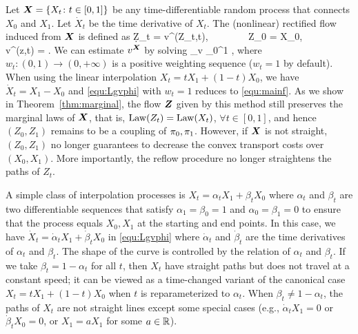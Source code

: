 Let 
${{\boldsymbol{X}}} = \{X_t\colon t\in[0,1]\}$  be  any  time-differentiable 
random process that connects $X_0$ and $X_1$. Let $\dot X_t$ be the time derivative of $X_t$. 
The (nonlinear) rectified flow induced from ${\boldsymbol{X}}$ is defined as 
\bb 
\d Z_t = v^\X(Z_t,t)\dt, ~~~~~~~ Z_0 = X_0, ~~~~   ~~~~ v^\X(z,t) = .%
\ee 
We can estimate $v^{{\boldsymbol{X}}}$ by solving 
\bbb \label{equ:Lgvphi}
\min_{v} %
\int_0^1 
   \dt 
, 
\eee 
where %
$w_t \colon (0,1)\to (0,+\infty)$ is a positive weighting sequence ($w_t=1$ by default). 
When using the linear interpolation $X_t=tX_1 + (1-t)X_0$, we have $\dot X_t = X_1- X_0$ and 
\eqref{equ:Lgvphi} with $w_t=1$ reduces to \eqref{equ:mainf}. 
As we show in Theorem~\ref{thm:marginal}, 
the flow ${\boldsymbol{Z}}$ given by this method 
still preserves the marginal laws of ${\boldsymbol{X}}$, that is, $\mathrm{Law}(Z_t)=\mathrm{Law}(X_t)$, $\forall t\in[0,1]$, and hence  
$(Z_0,Z_1)$ remains to be a coupling of ${\pi}_0,{\pi}_1$. 
However, if ${\boldsymbol{X}}$ is not straight, 
$(Z_0,Z_1)$ no longer guarantees to decrease the convex transport costs over $(X_0,X_1)$. More importantly,  the reflow procedure no longer straightens the paths of $Z_t$. 


A simple class of interpolation processes is $X_t = \alpha_t X_1 + \beta_t X_0$ where $\alpha_t$ and $\beta_t$ 
are two differentiable sequences that satisfy $\alpha_1=\beta_0=1$ and $\alpha_0=\beta_1 = 0$ to ensure that the process equals $X_0,X_1$ at the starting and end points. In this case,
we have $\dot X_t = \dot \alpha_t X_1 + \dot \beta_t X_0$ in \eqref{equ:Lgvphi} where $\dot \alpha_t$ and $\dot\beta_t$ are the time derivatives of $\alpha_t$ and $\beta_t$. 
The shape of the curve is controlled by the relation of $\alpha_t$ and $\beta_t$. If we take $ \beta_t =1-\alpha_t$ for all $t$, then  $X_t$ have  straight paths but does not travel at a constant speed; it can be viewed as a time-changed variant of the canonical case $X_t = t X_1 + (1-t)X_0$ when $t$ is reparameterized to $\alpha_t$. %
When $\beta_t\neq 1-\alpha_t$, the paths of $X_t$ 
are not straight lines except some special cases (e.g., $\dot\alpha_t X_1=0$ or $\dot \beta_t X_0 = 0$, or $X_1 = a X_1$ for some $a\in\mathbb{R}$).

